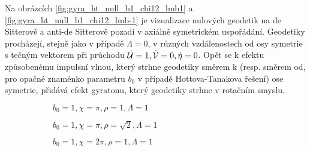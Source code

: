 Na obrázcích \ref{fig:gyra_ht_null_b1_chi12_lmb1} a \ref{fig:gyra_ht_null_b1_chi12_lmb-1} je vizualizace nulových geodetik na de Sitterově a anti-de Sitterově pozadí v axiálně symetrickém uspořádání.
Geodetiky procházejí, stejně jako v případě $\Lambda = 0$, v různých vzdálenostech od osy symetrie s tečným vektorem při průchodu $\dot{\mathcal{U}} = 1, \dot{\mathcal{V}}=0, \dot\eta=0$.
Opět se k efektu způsobenému impulsní vlnou, který strhne geodetiky směrem k (resp. směrem od, pro opačné znaménko parametru $b_0$ v případě Hottova-Tanakova řešení) ose symetrie, přidává efekt gyratonu,
který geodetiky strhne v rotačním smyslu.

\begin{figure}[H]
    \centering
    \begin{subfigure}[b]{0.48\textwidth}
        \caption{$b_0=1, \chi=\pi, \rho=1, \Lambda = 1$} 
    \end{subfigure}
    \hfill
    \begin{subfigure}[b]{0.48\textwidth}
        \caption{$b_0=1, \chi=\pi, \rho=\sqrt{2}, \Lambda = 1$}
    \end{subfigure}
    \hfill
    \begin{subfigure}[b]{0.48\textwidth}
        \caption{$b_0=1, \chi=2\pi, \rho=1, \Lambda = 1$}
    \end{subfigure}
    \hfill
    \begin{subfigure}[b]{0.48\textwidth}

\end{subfigure}
\end{figure}
